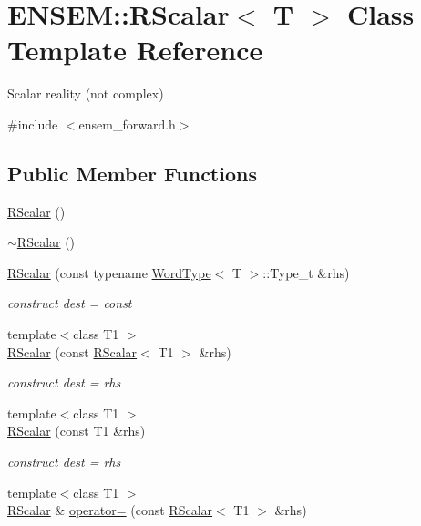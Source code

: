 \hypertarget{classENSEM_1_1RScalar}{}\section{E\+N\+S\+EM\+:\+:R\+Scalar$<$ T $>$ Class Template Reference}
\label{classENSEM_1_1RScalar}


Scalar reality (not complex)  




{\ttfamily \#include $<$ensem\+\_\+forward.\+h$>$}

\subsection*{Public Member Functions}
\begin{DoxyCompactItemize}
\item 
\mbox{\hyperlink{classENSEM_1_1RScalar_aef2d18c787b469c86b94f18e711cd556}{R\+Scalar}} ()
\item 
\mbox{\hyperlink{classENSEM_1_1RScalar_a6508c0b6ff5db38e53a19f0d376dde49}{$\sim$\+R\+Scalar}} ()
\item 
\mbox{\hyperlink{classENSEM_1_1RScalar_a49babd15684b91b796da264d2aa2681f}{R\+Scalar}} (const typename \mbox{\hyperlink{structENSEM_1_1WordType}{Word\+Type}}$<$ T $>$\+::Type\+\_\+t \&rhs)
\begin{DoxyCompactList}\small\item\em construct dest = const \end{DoxyCompactList}\item 
{\footnotesize template$<$class T1 $>$ }\\\mbox{\hyperlink{classENSEM_1_1RScalar_a93e56021a00d35af008ae72de2eb60f2}{R\+Scalar}} (const \mbox{\hyperlink{classENSEM_1_1RScalar}{R\+Scalar}}$<$ T1 $>$ \&rhs)
\begin{DoxyCompactList}\small\item\em construct dest = rhs \end{DoxyCompactList}\item 
{\footnotesize template$<$class T1 $>$ }\\\mbox{\hyperlink{classENSEM_1_1RScalar_aef7513413ed5dbf6bb8bc37b73b88d00}{R\+Scalar}} (const T1 \&rhs)
\begin{DoxyCompactList}\small\item\em construct dest = rhs \end{DoxyCompactList}\item 
{\footnotesize template$<$class T1 $>$ }\\\mbox{\hyperlink{classENSEM_1_1RScalar}{R\+Scalar}} \& \mbox{\hyperlink{classENSEM_1_1RScalar_a81b105339878a490866e9467135ae4fa}{operator=}} (const \mbox{\hyperlink{classENSEM_1_1RScalar}{R\+Scalar}}$<$ T1 $>$ \&rhs)

\end{DoxyCompactItemize}
